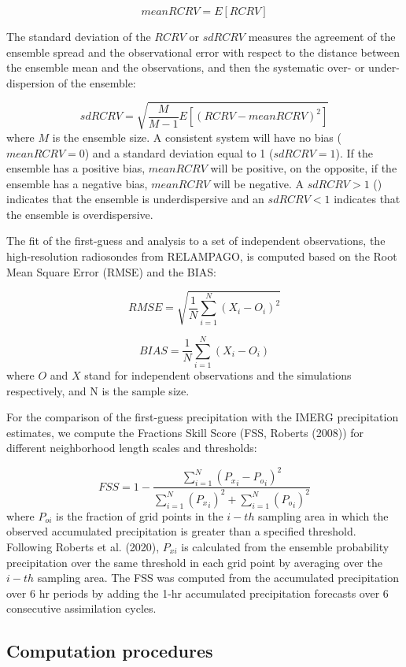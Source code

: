 \documentclass[authoryear,preprint,review,12pt]{elsarticle} %
\begin{document}
\[\mathit{mean RCRV} = E[RCRV]\]

The standard deviation of the \(RCRV\) or \(sd RCRV\) measures the agreement of the ensemble spread and the observational error with respect to the distance between the ensemble mean and the observations, and then the systematic over- or under- dispersion of the ensemble:

\[\mathit{sd RCRV} = \sqrt{\frac{M}{M -1}E[(\mathit{RCRV} - \mathit{mean RCRV})^2]}\]
where \(M\) is the ensemble size. A consistent system will have no bias (\(mean RCRV = 0\)) and a standard deviation equal to 1 (\(sd RCRV = 1\)). If the ensemble has a positive bias, \(mean RCRV\) will be positive, on the opposite, if the ensemble has a negative bias, \(mean RCRV\) will be negative. A \(sd RCRV > 1\) () indicates that the ensemble is underdispersive and an \(sd RCRV < 1\) indicates that the ensemble is overdispersive.

The fit of the first-guess and analysis to a set of independent observations, the high-resolution radiosondes from RELAMPAGO, is computed based on the Root Mean Square Error (RMSE) and the BIAS:

\[\mathit{RMSE} = \sqrt{\frac{1}{N}\sum_{i = 1}^{N} (X_i - O_i)^{2}}\]

\[\mathit{BIAS} = \frac{1}{N}\sum_{i = 1}^{N} (X_i - O_i)\]
where \(O\) and \(X\) stand for independent observations and the simulations respectively, and N is the sample size.

For the comparison of the first-guess precipitation with the IMERG precipitation estimates, we compute the Fractions Skill Score (FSS, Roberts (2008)) for different neighborhood length scales and thresholds:

\[\mathit{FSS} = 1-\frac{\sum_{i=1}^{N} ({P_x}_i-{P_o}_i)^{2}}{\sum_{i=1}^{N} ({P_x}_i)^{2}+\sum_{i=1}^{N} ({P_o}_i)^{2}} \]
where \(P_{oi}\) is the fraction of grid points in the \(i-th\) sampling area in which the observed accumulated precipitation is greater than a specified threshold. Following Roberts et al. (2020), \(P_{xi}\) is calculated from the ensemble probability precipitation over the same threshold in each grid point by averaging over the \(i-th\) sampling area.
The FSS was computed from the accumulated precipitation over 6 hr periods by adding the 1-hr accumulated precipitation forecasts over 6 consecutive assimilation cycles.

\hypertarget{computation-procedures}{%
\subsection{Computation procedures}\label{computation-procedures}}
\end{document}
